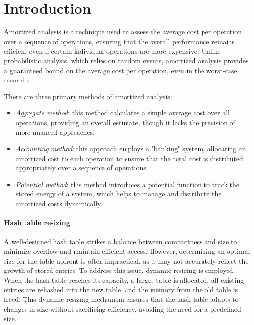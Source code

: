 \section{Introduction}

Amortized analysis is a technique used to assess the average cost per operation over a sequence of operations, ensuring that the overall performance remains efficient even if certain individual operations are more expensive.
Unlike probabilistic analysis, which relies on random events, amortized analysis provides a guaranteed bound on the average cost per operation, even in the worst-case scenario.

There are three primary methods of amortized analysis:
\begin{itemize} 
    \item \textit{Aggregate method}: this method calculates a simple average cost over all operations, providing an overall estimate, though it lacks the precision of more nuanced approaches. 
    \item \textit{Accounting method}: this approach employs a "banking" system, allocating an amortized cost to each operation to ensure that the total cost is distributed appropriately over a sequence of operations. 
    \item \textit{Potential method}: this method introduces a potential function to track the stored energy of a system, which helps to manage and distribute the amortized costs dynamically. 
\end{itemize}

\paragraph*{Hash table resizing}
A well-designed hash table strikes a balance between compactness and size to minimize overflow and maintain efficient access. 
However, determining an optimal size for the table upfront is often impractical, as it may not accurately reflect the growth of stored entries. 
To address this issue, dynamic resizing is employed. When the hash table reaches its capacity, a larger table is allocated, all existing entries are rehashed into the new table, and the memory from the old table is freed. 
This dynamic resizing mechanism ensures that the hash table adapts to changes in size without sacrificing efficiency, avoiding the need for a predefined size.